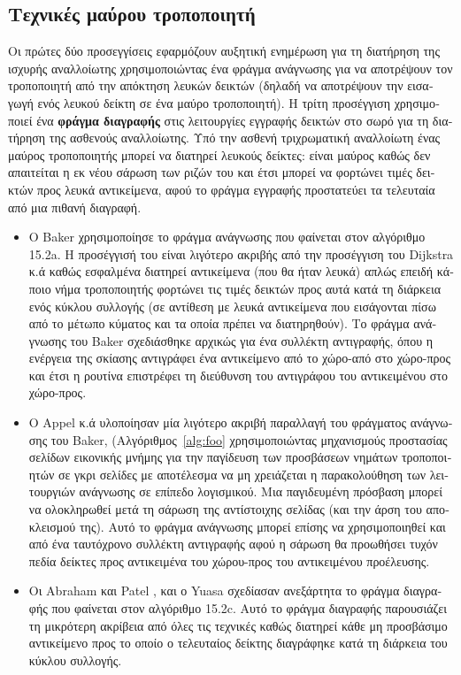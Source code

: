 \begin{greek}
\subsection{Τεχνικές μαύρου τροποποιητή}
Οι πρώτες δύο προσεγγίσεις εφαρμόζουν αυξητική ενημέρωση για
τη διατήρηση της ισχυρής αναλλοίωτης χρησιμοποιώντας ένα φράγμα
ανάγνωσης για να αποτρέψουν τον τροποποιητή από την απόκτηση
λευκών δεικτών (δηλαδή να αποτρέψουν την εισαγωγή ενός λευκού
δείκτη σε ένα μαύρο τροποποιητή). Η τρίτη προσέγγιση χρησιμοποιεί
ένα \textbf{φράγμα διαγραφής} στις λειτουργίες εγγραφής δεικτών
στο σωρό για τη διατήρηση της ασθενούς αναλλοίωτης. Υπό την
ασθενή τριχρωματική αναλλοίωτη ένας μαύρος τροποποιητής μπορεί
να διατηρεί λευκούς δείκτες: είναι μαύρος καθώς δεν απαιτείται
η εκ νέου σάρωση των ριζών του και έτσι μπορεί να φορτώνει
τιμές δεικτών προς λευκά αντικείμενα, αφού το φράγμα εγγραφής
προστατεύει τα τελευταία από μια πιθανή διαγραφή.

\begin{itemize}
\item Ο Baker \cite{DBLP:journals/cacm/Baker78} χρησιμοποίησε
  το φράγμα ανάγνωσης που φαίνεται στον αλγόριθμο 15.2a. Η
  προσέγγισή του είναι λιγότερο ακριβής από την προσέγγιση του
  Dijkstra κ.ά καθώς εσφαλμένα διατηρεί αντικείμενα (που θα
  ήταν λευκά) απλώς επειδή κάποιο νήμα τροποποιητής φορτώνει
  τις τιμές δεικτών προς αυτά κατά τη διάρκεια ενός κύκλου
  συλλογής (σε αντίθεση με λευκά αντικείμενα που εισάγονται
  πίσω από το μέτωπο κύματος και τα οποία πρέπει να διατηρηθούν).
  Το φράγμα ανάγνωσης του Baker σχεδιάσθηκε αρχικώς για ένα
  συλλέκτη αντιγραφής, όπου η ενέργεια της σκίασης αντιγράφει
  ένα αντικείμενο από το χώρο-από στο χώρο-προς και έτσι η
  ρουτίνα  επιστρέφει τη διεύθυνση του αντιγράφου
  του αντικειμένου στο χώρο-προς. 
\item Ο Appel κ.ά \cite{DBLP:conf/pldi/AppelEL88} υλοποίησαν
  μία λιγότερο ακριβή παραλλαγή του φράγματος ανάγνωσης του
  Baker, (Αλγόριθμος~\ref{alg:foo} χρησιμοποιώντας μηχανισμούς
  προστασίας σελίδων εικονικής μνήμης για την παγίδευση των
  προσβάσεων νημάτων τροποποιητών σε γκρι σελίδες με αποτέλεσμα
  να μη χρειάζεται η παρακολούθηση των λειτουργιών ανάγνωσης σε
  επίπεδο λογισμικού. Μια παγιδευμένη πρόσβαση μπορεί να
  ολοκληρωθεί μετά τη σάρωση της αντίστοιχης σελίδας (και την
  άρση του αποκλεισμού της). Αυτό το φράγμα ανάγνωσης μπορεί
  επίσης να χρησιμοποιηθεί και από ένα ταυτόχρονο συλλέκτη
  αντιγραφής αφού η σάρωση θα προωθήσει τυχόν πεδία δείκτες
  προς αντικειμένα του χώρου-προς του αντικειμένου προέλευσης.   
\item Οι Abraham και Patel \cite{DBLP:conf/icpp/AbrahamP87},
  και ο Yuasa \cite{DBLP:journals/jss/Yuasa90} σχεδίασαν
  ανεξάρτητα το φράγμα διαγραφής που φαίνεται στον αλγόριθμο
  15.2c. Αυτό το φράγμα διαγραφής παρουσιάζει τη μικρότερη
  ακρίβεια από όλες τις τεχνικές καθώς διατηρεί κάθε μη
  προσβάσιμο αντικείμενο προς το οποίο ο τελευταίος δείκτης
  διαγράφηκε κατά τη διάρκεια του κύκλου συλλογής. 
\end{itemize}


\end{greek}
